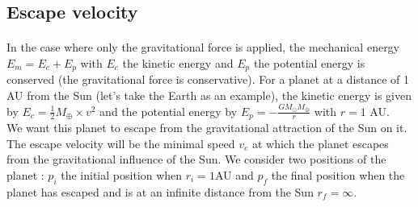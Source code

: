 \documentclass[a4paper, twoside, 11pt]{report}
\theoremstyle{theorem}
\theoremstyle{remark}
\theoremstyle{exemple}
\begin{document}
        \subsection{Escape velocity}
        
            \paragraph{}In the case where only the gravitational force is applied, the mechanical energy $E_m = E_c + E_p$ with $E_c$ the kinetic energy and $E_p$ the potential energy is conserved (the gravitational force is conservative). For a planet at a distance of 1 AU from the Sun (let's take the Earth as an example), the kinetic energy is given by $E_c = \frac{1}{2}M_{\oplus}\times v^2$ and the potential energy by $E_p = - \frac{G M_{\odot} M_{\oplus}}{r}$ with $r=1$ AU. 
            \\We want this planet to escape from the gravitational attraction of the Sun on it. The escape velocity will be the minimal speed $v_e$ at which the planet escapes from the gravitational influence of the Sun. We consider two positions of the planet : $p_i$ the initial position when $r_i=1$AU and $p_f$ the final position when the planet has escaped and is at an infinite distance from the Sun $r_f=\infty$.
            
\end{document}
